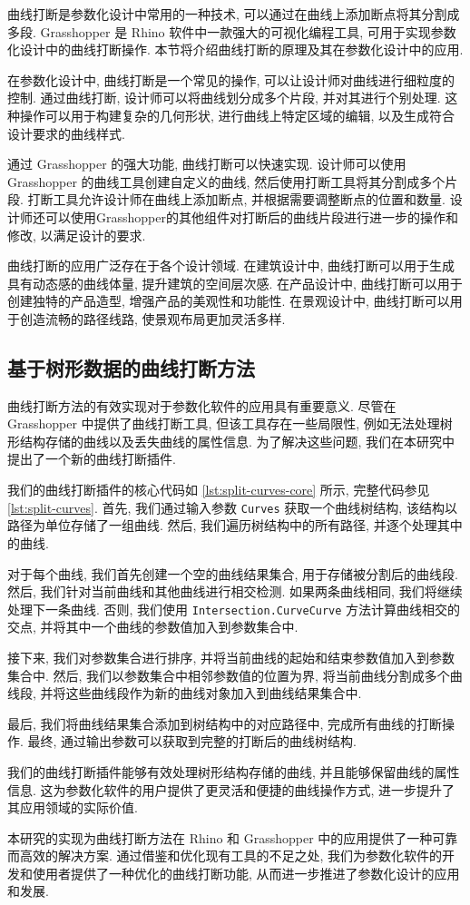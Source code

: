 曲线打断是参数化设计中常用的一种技术, 可以通过在曲线上添加断点将其分割成多段.
Grasshopper 是 Rhino 软件中一款强大的可视化编程工具, 可用于实现参数化设计中的曲线打断操作.
本节将介绍曲线打断的原理及其在参数化设计中的应用.

在参数化设计中, 曲线打断是一个常见的操作, 可以让设计师对曲线进行细粒度的控制.
通过曲线打断, 设计师可以将曲线划分成多个片段, 并对其进行个别处理.
这种操作可以用于构建复杂的几何形状, 进行曲线上特定区域的编辑, 以及生成符合设计要求的曲线样式.

通过 Grasshopper 的强大功能, 曲线打断可以快速实现.
设计师可以使用 Grasshopper 的曲线工具创建自定义的曲线, 然后使用打断工具将其分割成多个片段.
打断工具允许设计师在曲线上添加断点, 并根据需要调整断点的位置和数量.
设计师还可以使用Grasshopper的其他组件对打断后的曲线片段进行进一步的操作和修改, 以满足设计的要求.

曲线打断的应用广泛存在于各个设计领域.
在建筑设计中, 曲线打断可以用于生成具有动态感的曲线体量, 提升建筑的空间层次感.
在产品设计中, 曲线打断可以用于创建独特的产品造型, 增强产品的美观性和功能性.
在景观设计中, 曲线打断可以用于创造流畅的路径线路, 使景观布局更加灵活多样.

\subsection{基于树形数据的曲线打断方法}

曲线打断方法的有效实现对于参数化软件的应用具有重要意义.
尽管在 Grasshopper 中提供了曲线打断工具, 但该工具存在一些局限性, 例如无法处理树形结构存储的曲线以及丢失曲线的属性信息.
为了解决这些问题, 我们在本研究中提出了一个新的曲线打断插件.


我们的曲线打断插件的核心代码如 \cref{lst:split-curves-core} 所示, 完整代码参见 \cref{lst:split-curves}.
首先, 我们通过输入参数 \texttt{Curves} 获取一个曲线树结构, 该结构以路径为单位存储了一组曲线.
然后, 我们遍历树结构中的所有路径, 并逐个处理其中的曲线.

对于每个曲线, 我们首先创建一个空的曲线结果集合, 用于存储被分割后的曲线段.
然后, 我们针对当前曲线和其他曲线进行相交检测.
如果两条曲线相同, 我们将继续处理下一条曲线.
否则, 我们使用 \texttt{Intersection.CurveCurve} 方法计算曲线相交的交点, 并将其中一个曲线的参数值加入到参数集合中.

接下来, 我们对参数集合进行排序, 并将当前曲线的起始和结束参数值加入到参数集合中.
然后, 我们以参数集合中相邻参数值的位置为界, 将当前曲线分割成多个曲线段, 并将这些曲线段作为新的曲线对象加入到曲线结果集合中.

最后, 我们将曲线结果集合添加到树结构中的对应路径中, 完成所有曲线的打断操作.
最终, 通过输出参数可以获取到完整的打断后的曲线树结构.

我们的曲线打断插件能够有效处理树形结构存储的曲线, 并且能够保留曲线的属性信息.
这为参数化软件的用户提供了更灵活和便捷的曲线操作方式, 进一步提升了其应用领域的实际价值.

本研究的实现为曲线打断方法在 Rhino 和 Grasshopper 中的应用提供了一种可靠而高效的解决方案.
通过借鉴和优化现有工具的不足之处, 我们为参数化软件的开发和使用者提供了一种优化的曲线打断功能, 从而进一步推进了参数化设计的应用和发展.
